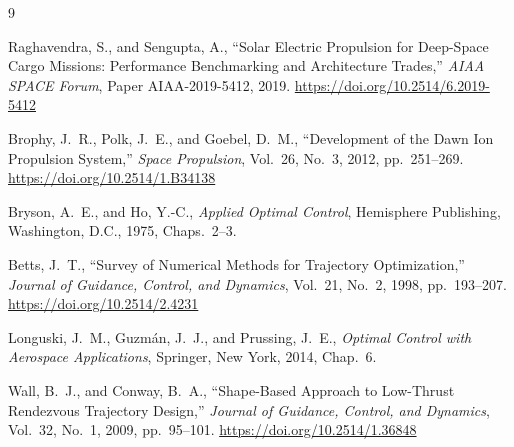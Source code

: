 \begin{thebibliography}{9}

Raghavendra, S., and Sengupta, A.,
``Solar Electric Propulsion for Deep-Space Cargo Missions: Performance
  Benchmarking and Architecture Trades,''
\textit{AIAA SPACE Forum}, Paper AIAA-2019-5412, 2019.
\url{https://doi.org/10.2514/6.2019-5412}

Brophy, J.~R., Polk, J.~E., and Goebel, D.~M.,
``Development of the Dawn Ion Propulsion System,''
\textit{Space Propulsion},
Vol.~26, No.~3, 2012, pp.~251–269.
\url{https://doi.org/10.2514/1.B34138}

Bryson, A.~E., and Ho, Y.-C.,
\textit{Applied Optimal Control},
Hemisphere Publishing, Washington, D.C., 1975, Chaps.~2–3.

Betts, J.~T.,
``Survey of Numerical Methods for Trajectory Optimization,''
\textit{Journal of Guidance, Control, and Dynamics},
Vol.~21, No.~2, 1998, pp.~193–207.
\url{https://doi.org/10.2514/2.4231}

Longuski, J.~M., Guzm\'{a}n, J.~J., and Prussing, J.~E.,
\textit{Optimal Control with Aerospace Applications},
Springer, New York, 2014, Chap.~6.

Wall, B.~J., and Conway, B.~A.,
``Shape-Based Approach to Low-Thrust Rendezvous Trajectory Design,''
\textit{Journal of Guidance, Control, and Dynamics},
Vol.~32, No.~1, 2009, pp.~95–101.
\url{https://doi.org/10.2514/1.36848}

\end{thebibliography}
